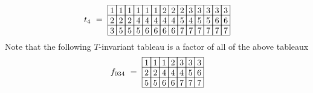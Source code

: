 \[
t_4\ =\ 
\begin{array}[c]{*{14}c}\cline{1-14}
\lr{1}&\lr{1}&\lr{1}&\lr{1}&\lr{1}&\lr{1}&\lr{2}&\lr{2}&\lr{2}&\lr{3}&\lr{3}&\lr{3}&\lr{3}&\lr{3}\\\cline{1-14}
\lr{2}&\lr{2}&\lr{2}&\lr{4}&\lr{4}&\lr{4}&\lr{4}&\lr{4}&\lr{5}&\lr{4}&\lr{5}&\lr{5}&\lr{6}&\lr{6}\\\cline{1-14}
\lr{3}&\lr{5}&\lr{5}&\lr{5}&\lr{6}&\lr{6}&\lr{6}&\lr{6}&\lr{7}&\lr{7}&\lr{7}&\lr{7}&\lr{7}&\lr{7}\\\cline{1-14}
\end{array}
\]
Note that the following $T$-invariant tableau is a factor of all of the above tableaux
\[
f_{034}\ =\ 
\begin{array}[c]{*{7}c}\cline{1-7}
\lr{1}&\lr{1}&\lr{1}&\lr{2}&\lr{3}&\lr{3}&\lr{3}\\\cline{1-7}
\lr{2}&\lr{2}&\lr{4}&\lr{4}&\lr{4}&\lr{5}&\lr{6}\\\cline{1-7}
\lr{5}&\lr{5}&\lr{6}&\lr{6}&\lr{7}&\lr{7}&\lr{7}\\\cline{1-7}
\end{array}
\]

